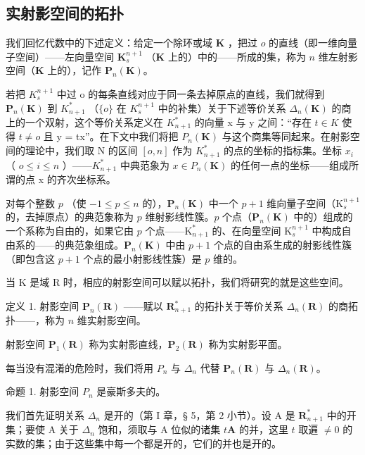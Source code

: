 \subsection{实射影空间的拓扑}

我们回忆代数中的下述定义：给定一个除环或域 \(\mathbf{K}\) ，把过 \(o\) 的直线（即一维向量子空间）——左向量空间 \(\mathbf{K}_s^{n+1}\) （\(\mathbf{K}\) 上的）中的——所成的集，称为 \(n\) 维左射影空间（\(\mathbf{K}\) 上的），记作 \(\mathbf{P}_n(\mathbf{K})\)。

若把 \(K_{s}^{n+1}\) 中过 o 的每条直线对应于同一条去掉原点的直线，我们就得到 \(\mathbf{P}_{n}(\mathbf{K})\) 到 \(K_{n+1}^{*}\) （\(\{o\}\) 在 \(K_{s}^{n+1}\) 中的补集）关于下述等价关系 \(\Delta_{n}(\mathbf{K})\) 的商上的一个双射，这个等价关系定义在 \(K_{n+1}^{*}\) 的向量 x 与 y 之间：“存在 \(t \in K\) 使得 \(t \neq o\) 且 y = tx”。在下文中我们将把 \(P_{n}(\mathbf{K})\) 与这个商集等同起来。在射影空间的理论中，我们取 N 的区间 \([o, n]\) 作为 \(K_{n+1}^{*}\) 的点的坐标的指标集。坐标 \(x_{i}\) （ \(o \leqslant i \leqslant n\) ）——\(K_{n+1}^{*}\) 中典范象为 \(x \in P_{n}(\mathbf{K})\) 的任何一点的坐标——组成所谓的点 x 的齐次坐标系。

对每个整数 \(p\) （使 \(-1 \leqslant p \leqslant n\) 的），\(\mathbf{P}_n(\mathbf{K})\) 中一个 \(p + 1\) 维向量子空间（\(\mathrm{K}_s^{n+1}\) 的，去掉原点）的典范象称为 \(p\) 维射影线性簇。\(p\) 个点（\(\mathbf{P}_n(\mathbf{K})\) 中的）组成的一个系称为自由的，如果它由 \(p\) 个点——\(\mathrm{K}_{n+1}^*\) 的、在向量空间 \(\mathrm{K}_s^{n+1}\) 中构成自由系的——的典范象组成。\(\mathbf{P}_n(\mathbf{K})\) 中由 \(p + 1\) 个点的自由系生成的射影线性簇（即包含这 \(p + 1\) 个点的最小射影线性簇）是 \(p\) 维的。

当 K 是域 R 时，相应的射影空间可以赋以拓扑，我们将研究的就是这些空间。

定义 1. 射影空间 \(\mathbf{P}_n(\mathbf{R})\) ——赋以 \(\mathbf{R}_{n+1}^*\) 的拓扑关于等价关系 \(\Delta_n(\mathbf{R})\) 的商拓扑——，称为 \(n\) 维实射影空间。

射影空间 \(\mathbf{P}_{1}(\mathbf{R})\) 称为实射影直线，\(\mathbf{P}_{2}(\mathbf{R})\) 称为实射影平面。

每当没有混淆的危险时，我们将用 \(P_{n}\) 与 \(\Delta_{n}\) 代替 \(\mathbf{P}_{n}(\mathbf{R})\) 与 \(\Delta_{n}(\mathbf{R})\)。

命题 1. 射影空间 \(P_{n}\) 是豪斯多夫的。

我们首先证明关系 \(\Delta_{n}\) 是开的（第 I 章，§ 5，第 2 小节）。设 A 是 \(\mathbf{R}_{n+1}^{*}\) 中的开集；要使 A 关于 \(\Delta_{n}\) 饱和，须取与 A 位似的诸集 \(t\mathbf{A}\) 的并，这里 \(t\) 取遍 \(\neq 0\) 的实数的集；由于这些集中每一个都是开的，它们的并也是开的。

